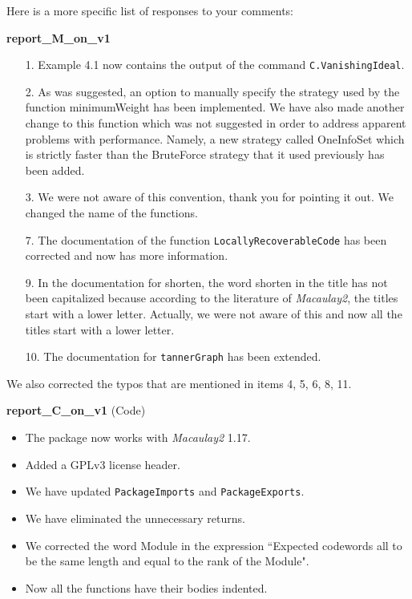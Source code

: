 \documentclass[12pt]{amsart}
\theoremstyle{plain}
\begin{document}
Here is a more specific list of responses to your comments:
\begin{center}
{\bf report\_M\_on\_v1}
\end{center}
\begin{itemize}
\item[\rm 1.] Example 4.1 now contains the output of the command {\tt C.VanishingIdeal}.
\item[\rm 2.] As was suggested, an option to manually specify the strategy used by the function {\ttfamily minimumWeight} has been implemented. We have also made another change to this function which was not suggested in order to address apparent problems with performance. Namely, a new strategy called {\ttfamily OneInfoSet} which is strictly faster than the {\ttfamily BruteForce} strategy that it used previously has been added.

\item[\rm 3.] We were not aware of this convention, thank you for pointing it out. We changed the name of the functions.
\item[\rm 7.] The documentation of the function {\tt LocallyRecoverableCode} has been corrected and now has more information.
\item[\rm 9.] In the documentation for shorten, the word shorten in the title has not been capitalized because according to the literature of {\it Macaulay2}, the titles start with a lower letter. Actually, we were not aware of this and now all the titles start with a lower letter.
\item[\rm 10.] The documentation for {\tt tannerGraph} has been extended.
\end{itemize}
We also corrected the typos that are mentioned in items 4, 5, 6, 8, 11.
\begin{center}
{\bf report\_C\_on\_v1} (Code)
\end{center}
\begin{itemize}
\item The package now works with {\it Macaulay2} 1.17.
\item Added a GPLv3 license header. 
\item We have updated {\tt PackageImports} and {\tt PackageExports}.
\item We have eliminated the unnecessary returns.
\item We corrected the word Module in the expression ``Expected codewords all to be the same length and equal to the rank of the Module".
\item Now all the functions have their bodies indented.
\end{itemize}
\end{document}
